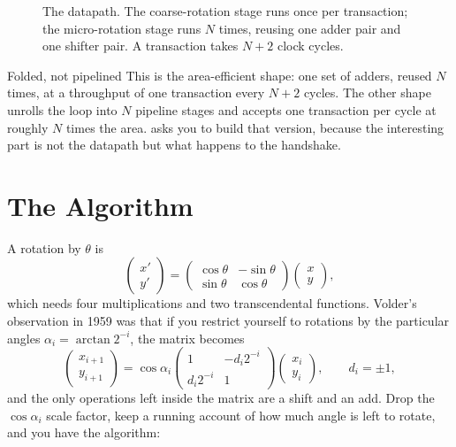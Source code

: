 \begin{figure}[htbp]
  \caption{The  datapath. The coarse-rotation stage runs
  once per transaction; the micro-rotation stage runs $N$ times, reusing one
  adder pair and one shifter pair. A transaction takes $N + 2$ clock cycles.}
  \label{fig:case:block}
\end{figure}

\begin{notebox}{Folded, not pipelined}
This is the area-efficient shape: one set of adders, reused $N$ times, at a
throughput of one transaction every $N + 2$ cycles. The other shape unrolls
the loop into $N$ pipeline stages and accepts one transaction per cycle at
roughly $N$ times the area.  asks you to build that
version, because the interesting part is not the datapath but what happens to
the handshake.
\end{notebox}

\section{The Algorithm}
\label{sec:case:algorithm}

A rotation by $\theta$ is
\[
  \begin{pmatrix} x' \\ y' \end{pmatrix} =
  \begin{pmatrix} \cos\theta & -\sin\theta \\
                  \sin\theta & \cos\theta \end{pmatrix}
  \begin{pmatrix} x \\ y \end{pmatrix} ,
\]
which needs four multiplications and two transcendental functions. Volder's
observation in 1959 was that if you restrict yourself to rotations by the
particular angles $\alpha_i = \arctan 2^{-i}$, the matrix becomes
\[
  \begin{pmatrix} x_{i+1} \\ y_{i+1} \end{pmatrix} =
  \cos\alpha_i
  \begin{pmatrix} 1 & -d_i 2^{-i} \\ d_i 2^{-i} & 1 \end{pmatrix}
  \begin{pmatrix} x_i \\ y_i \end{pmatrix} ,
  \qquad d_i = \pm 1 ,
\]
and the only operations left inside the matrix are a shift and an add. Drop
the $\cos\alpha_i$ scale factor, keep a running account of how much angle is
left to rotate, and you have the algorithm:

